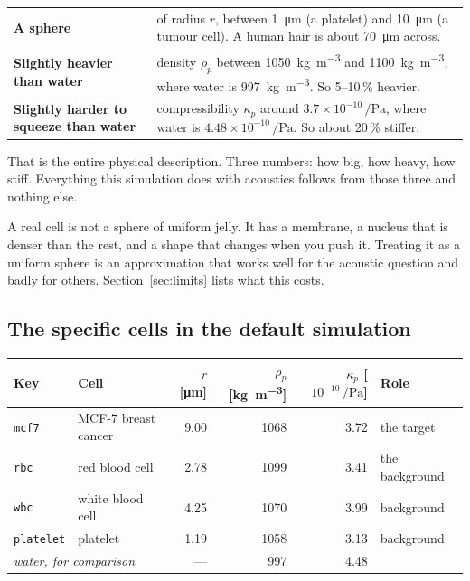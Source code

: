 \documentclass[11pt,a4paper]{article}
\newcommand{\dims}[1]{\textcolor{muted}{\footnotesize [#1]}}
\begin{document}
\begin{center}
\small
\begin{tabular}{lp{10.5cm}}
\toprule
\textbf{A sphere} & of radius $r$, between \SI{1}{\micro\meter} (a platelet) and
\SI{10}{\micro\meter} (a tumour cell). A human hair is about
\SI{70}{\micro\meter} across. \\[3pt]
\textbf{Slightly heavier than water} & density $\rho_p$ between
\SI{1050}{\kilogram\per\cubic\meter} and \SI{1100}{\kilogram\per\cubic\meter},
where water is \SI{997}{\kilogram\per\cubic\meter}. So 5--10\,\% heavier. \\[3pt]
\textbf{Slightly harder to squeeze than water} & compressibility $\kappa_p$
around $3.7\times10^{-10}\,\si{\per\pascal}$, where water is
$4.48\times10^{-10}\,\si{\per\pascal}$. So about 20\,\% stiffer. \\
\bottomrule
\end{tabular}
\end{center}

That is the entire physical description. Three numbers: how big, how heavy, how
stiff. Everything this simulation does with acoustics follows from those three
and nothing else.

\begin{warnbox}
A real cell is not a sphere of uniform jelly. It has a membrane, a nucleus that
is denser than the rest, and a shape that changes when you push it. Treating it
as a uniform sphere is an approximation that works well for the acoustic
question and badly for others. Section~\ref{sec:limits} lists what this costs.
\end{warnbox}

\subsection*{The specific cells in the default simulation}

\begin{center}
\small
\begin{tabular}{llrrrl}
\toprule
\textbf{Key} & \textbf{Cell} & $r$ \dims{\si{\micro\meter}} &
$\rho_p$ \dims{\si{\kilogram\per\cubic\meter}} &
$\kappa_p$ \dims{$10^{-10}\,\si{\per\pascal}$} & \textbf{Role} \\
\midrule
\texttt{mcf7} & MCF-7 breast cancer & 9.00 & 1068 & 3.72 & the target \\
\texttt{rbc}  & red blood cell      & 2.78 & 1099 & 3.41 & the background \\
\texttt{wbc}  & white blood cell    & 4.25 & 1070 & 3.99 & background \\
\texttt{platelet} & platelet        & 1.19 & 1058 & 3.13 & background \\
\midrule
\multicolumn{2}{l}{\emph{water, for comparison}} & --- & 997 & 4.48 & \\
\bottomrule
\end{tabular}
\end{center}
\end{document}
